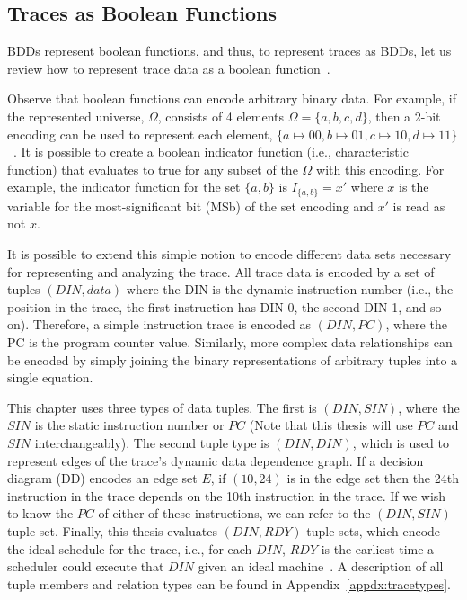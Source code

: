 {\subsection{Traces as Boolean Functions}

BDDs represent boolean functions, and thus, to represent traces as BDDs, let us review how to represent trace data as a boolean function~\cite{price:06:cal}.

Observe that boolean functions can encode arbitrary binary data.  For example, if the represented universe, $\Omega$, consists of 4 elements $\Omega = \{a,b,c,d\}$, then a 2-bit encoding can be used to represent each element, $\{a \mapsto 00, b \mapsto 01, c \mapsto 10, d \mapsto 11\}$~\cite{price:06:cal}.  It is possible to create a boolean indicator function (i.e., characteristic function) that evaluates to true for any subset of the $\Omega$ with this encoding.  For example, the indicator function for the set $\{a,b\}$ is $I_{\{a,b\}} = x'$ where $x$ is the variable for the most-significant bit (MSb) of the set encoding and $x'$ is read as not $x$.

\newcommand{\DIN}{\ensuremath{\mathrm{DIN}}} \newcommand{\PC}{\ensuremath{\mathrm{PC}}}

It is possible to extend this simple notion to encode different data sets necessary for representing and analyzing the trace.  All trace data is encoded by a set of tuples $(DIN,data)$ where the DIN is the dynamic instruction number (i.e., the position in the trace, the first instruction has DIN 0, the second DIN 1, and so on).  Therefore, a simple instruction trace is encoded as $(DIN,PC)$, where the PC is the program counter value. Similarly, more complex data relationships can be encoded by simply joining the binary representations of arbitrary tuples into a single equation.

This chapter uses three types of data tuples.  The first is $(DIN,SIN)$, where the $SIN$ is the static instruction number or $PC$ (Note that this thesis will use $PC$ and $SIN$ interchangeably).  The second tuple type is $(DIN,DIN)$, which is used to represent edges of the trace's dynamic data dependence graph.  If a decision diagram (DD) encodes an edge set $E$, if $(10,24)$ is in the edge set then the 24th instruction in the trace depends on the 10th instruction in the trace. If we wish to know the $PC$ of either of these instructions, we can refer to the $(DIN,SIN)$ tuple set.  Finally, this thesis evaluates $(DIN,RDY)$ tuple sets, which encode the ideal schedule for the trace, i.e., for each $DIN$, $RDY$ is the earliest time a scheduler could execute that $DIN$ given an ideal machine~\cite{price:08:pact}.  A description of all tuple members and relation types can be found in Appendix~\ref{appdx:tracetypes}.

}
